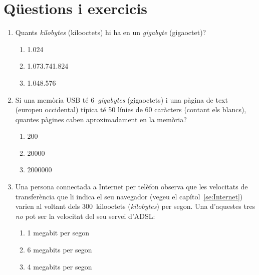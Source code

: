 \section{Qüestions i exercicis}
\begin{enumerate}
\item Quants \emph{kilobytes} (kilooctets) hi ha en un \emph{gigabyte}
  (gigaoctet)?
        \begin{enumerate}
        \item 1.024
        \item 1.073.741.824
        \item 1.048.576
        \end{enumerate}
        
      \item Si una memòria USB té 6~\emph{gigabytes}
        (gigaoctets) i una pàgina de text (europeu occidental) típica
        té 50 línies de 60 caràcters (contant els blancs), quantes
        pàgines caben aproximadament en la memòria?
       \begin{enumerate}
       \item 200
       \item 20000
       \item 2000000 
       \end{enumerate}
       

\item Una persona connectada a Internet per telèfon observa que les
  velocitats de transferència que li indica el seu navegador (vegeu el
  capítol~\ref{se:Internet}) varien al
  voltant dels 300~kilooctets (\emph{kilobytes}) per segon. Una
  d'aquestes tres \emph{no} pot ser la velocitat del seu servei d'ADSL:
     \begin{enumerate}
     \item 1 megabit per segon
     \item 6 megabits per segon
     \item 4 megabits per segon
     \end{enumerate}
 


\end{enumerate}
